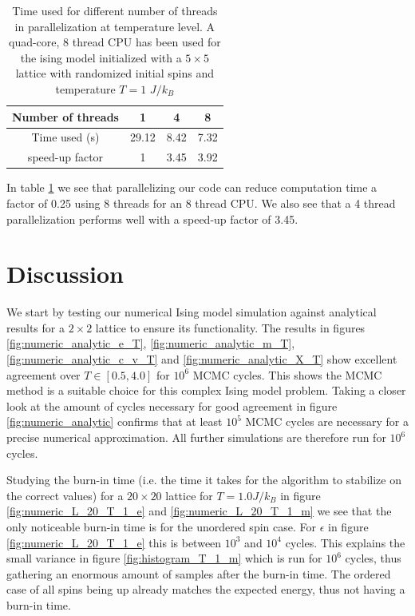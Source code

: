 \documentclass[english,notitlepage,reprint,nofootinbib]{revtex4-1}  %
\begin{document}
\begin{table}[H]
    \centering
    \caption{Time used for different number of threads in parallelization at temperature level. A quad-core, 8 thread CPU has been used for the ising model initialized with a $5\times5$ lattice with randomized initial spins and temperature $T= 1$ $J/k_B$}
    \label{tab:timing}
    \begin{tabular}{|c|c|c|c|}
        \hline
        Number of threads & 1     & 4    & 8    \\
        \hline
        Time used (s)     & 29.12 & 8.42 & 7.32 \\
        \hline
        speed-up factor   & 1     & 3.45 & 3.92 \\
        \hline
    \end{tabular}
\end{table}
In table \ref{tab:timing} we see that parallelizing our code can reduce computation time a factor of 0.25 using 8 threads for an 8 thread CPU. We also see that a 4 thread parallelization performs well with a speed-up factor of 3.45.
\section{Discussion}\label{sec:discussion}
We start by testing our numerical Ising model simulation against analytical results for a $2 \times 2$ lattice to ensure its functionality. The results in figures \ref{fig:numeric_analytic_e_T}, \ref{fig:numeric_analytic_m_T}, \ref{fig:numeric_analytic_c_v_T} and \ref{fig:numeric_analytic_X_T} show excellent agreement over $T \in [0.5, 4.0]$ for $10^6$ MCMC cycles. This shows the MCMC method is a suitable choice for this complex Ising model problem. Taking a closer look at the amount of cycles necessary for good agreement in figure \ref{fig:numeric_analytic} confirms that at least $10^5$ MCMC cycles are necessary for a precise numerical approximation. All further simulations are therefore run for $10^6$ cycles.

Studying the burn-in time (i.e. the time it takes for the algorithm to stabilize on the correct values) for a $20 \times 20$ lattice for $T=1.0 J/k_B$ in figure \ref{fig:numeric_L_20_T_1_e} and \ref{fig:numeric_L_20_T_1_m} we see that the only noticeable burn-in time is for the unordered spin case. For $\epsilon$ in figure \ref{fig:numeric_L_20_T_1_e} this is between $10^3$ and $10^4$ cycles. This explains the small variance in figure \ref{fig:histogram_T_1_m} which is run for $10^6$ cycles, thus gathering an enormous amount of samples after the burn-in time. The ordered case of all spins being up already matches the expected energy, thus not having a burn-in time.
\end{document}
